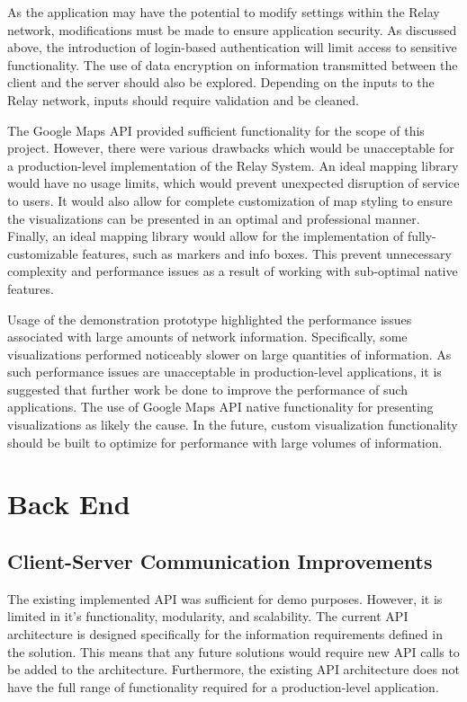 \documentclass{report}
\begin{document}
As the application may have the potential to modify settings within the Relay network, modifications must be made to ensure application security. As discussed above, the introduction of login-based authentication will limit access to sensitive functionality. The use of data encryption on information transmitted between the client and the server should also be explored. Depending on the inputs to the Relay network, inputs should require validation and be cleaned.

The Google Maps API provided sufficient functionality for the scope of this project. However, there were various drawbacks which would be unacceptable for a production-level implementation of the Relay System. An ideal mapping library would have no usage limits, which would prevent unexpected disruption of service to users. It would also allow for complete customization of map styling to ensure the visualizations can be presented in an optimal and professional manner. Finally, an ideal mapping library would allow for the implementation of fully-customizable features, such as markers and info boxes. This prevent unnecessary complexity and performance issues as a result of working with sub-optimal native features.

Usage of the demonstration prototype highlighted the performance issues associated with large amounts of network information. Specifically, some visualizations performed noticeably slower on large quantities of information. As such performance issues are unacceptable in production-level applications, it is suggested that further work be done to improve the performance of such applications. The use of Google Maps API native functionality for presenting visualizations as likely the cause. In the future, custom visualization functionality should be built to optimize for performance with large volumes of information.

\section{Back End}

\subsection{Client-Server Communication Improvements}

The existing implemented API was sufficient for demo purposes. However, it is limited in it's functionality, modularity, and scalability. The current API architecture is designed specifically for the information requirements defined in the solution. This means that any future solutions would require new API calls to be added to the architecture. Furthermore, the existing API architecture does not have the full range of functionality required for a production-level application.
\end{document}
